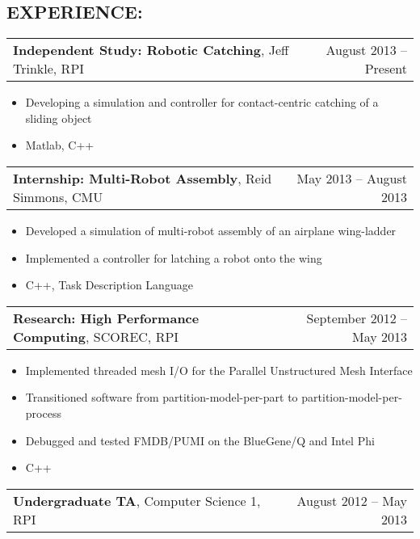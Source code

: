 \documentclass[margin]{res}
\begin{document}
\begin{resume}
 \section{EXPERIENCE:}
	\begin{tabular}{p{4in} r}
    {\bf Independent Study: Robotic Catching}, Jeff Trinkle, RPI & August 2013 -- Present
  \end{tabular}
  \begin{itemize}
    \item Developing a simulation and controller for contact-centric catching of a sliding object
    \item Matlab, C++
  \end{itemize}
	\vspace{-1.5mm}
	\begin{tabular}{p{4in} r}
    {\bf Internship: Multi-Robot Assembly}, Reid Simmons, CMU & May 2013 -- August 2013
  \end{tabular}
  \begin{itemize}
    \item Developed a simulation of multi-robot assembly of an airplane wing-ladder
    \item Implemented a controller for latching a robot onto the wing 
    \item C++, Task Description Language
  \end{itemize}
	\vspace{-1.5mm}
	\begin{tabular}{p{4in} r}
		{\bf Research: High Performance Computing}, SCOREC, RPI	& September 2012 -- May 2013\\
	\end{tabular}
	\begin{itemize}
		\item Implemented threaded mesh I/O for the Parallel Unstructured Mesh Interface
    \item Transitioned software from partition-model-per-part to partition-model-per-process
		\item Debugged and tested FMDB/PUMI on the BlueGene/Q and Intel Phi
    \item C++
	\end{itemize}
	\vspace{-1.5mm}
	\begin{tabular}{p{4in} r}
	  {\bf Undergraduate TA}, Computer Science 1, RPI 			& August 2012 -- May 2013\\
	\end{tabular}
	\begin{itemize}

\end{itemize}
\end{resume}
\end{document}
